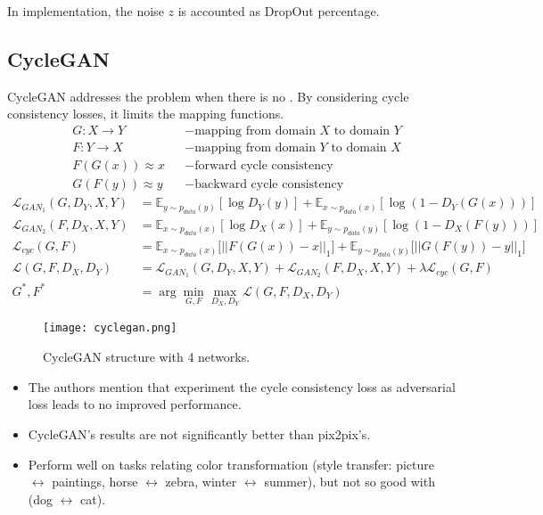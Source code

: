 \note In implementation, the noise $z$ is accounted as DropOut percentage.

\subsection{CycleGAN}
Cycle\ac{GAN} addresses the problem when there is no . By considering cycle consistency losses, it limits the mapping functions. \cite{zhu2017unpaired}
\begin{align}
	&G: X \rightarrow Y &&-\text{mapping from domain $X$ to domain $Y$}\\
	&F: Y \rightarrow X &&-\text{mapping from domain $Y$ to domain $X$}\\
	&F(G(x)) \approx x &&-\text{forward cycle consistency}\\
	&G(F(y)) \approx y &&-\text{backward cycle consistency}
\end{align}
\begin{align}
	\mathcal{L}_{GAN_1} (G, D_Y, X, Y) &= \mathbb{E}_{y \sim p_{data}(y)}[\log D_Y(y)] + \mathbb{E}_{x \sim p_{data}(x)} [\log (1 - D_Y(G(x)))]\\
	\mathcal{L}_{GAN_2} (F, D_X, X, Y) &= \mathbb{E}_{x \sim p_{data}(x)}[\log D_X(x)] + \mathbb{E}_{y \sim p_{data}(y)} [\log (1 - D_X(F(y)))]\\
	\mathcal{L}_{cyc}(G,F) &= \mathbb{E}_{x \sim p_{data}(x)}\big[||F(G(x))-x||_1 \big] + \mathbb{E}_{y \sim p_{data}(y)} \big[||G(F(y))-y||_1\big]\\
	\mathcal{L}(G, F, D_X, D_Y) &= \mathcal{L}_{GAN_1} (G, D_Y, X, Y) + \mathcal{L}_{GAN_2} (F, D_X, X, Y) + \lambda \mathcal{L}_{cyc}(G,F)\\
	G^*, F^* &= \arg\underset{G, F}{\min}\underset{D_X, D_Y}{\max} \mathcal{L}(G, F, D_X, D_Y)
\end{align}
\begin{figure}[hbt!]
	\centering
	\texttt{[image: cyclegan.png]}
	\caption{Cycle\ac{GAN} structure with 4 networks. \cite{zhu2017unpaired}}
\end{figure}

\note
\begin{itemize}
	\item The authors mention that experiment the cycle consistency loss as adversarial loss leads to no improved performance.
	\item Cycle\ac{GAN}'s results are not significantly better than pix2pix's.
	\item Perform well on tasks relating color transformation (\eg style transfer: picture $\leftrightarrow$ paintings, horse $\leftrightarrow$ zebra, winter $\leftrightarrow$ summer), but not so good with  (dog $\leftrightarrow$ cat).
\end{itemize}

